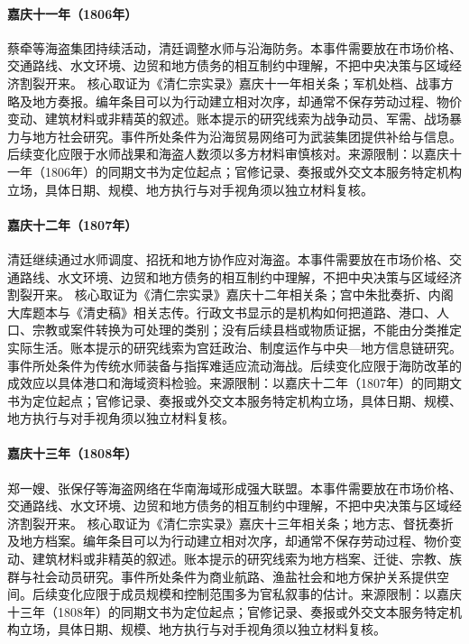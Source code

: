 \hypertarget{civic:EQ-1806-TSAI-QIAN-PIRACY}{}\paragraph{嘉庆十一年（1806年）}蔡牵等海盗集团持续活动，清廷调整水师与沿海防务。本事件需要放在市场价格、交通路线、水文环境、边贸和地方债务的相互制约中理解，不把中央决策与区域经济割裂开来。 核心取证为《清仁宗实录》嘉庆十一年相关条；军机处档、战事方略及地方奏报。编年条目可以为行动建立相对次序，却通常不保存劳动过程、物价变动、建筑材料或非精英的叙述。账本提示的研究线索为战争动员、军需、战场暴力与地方社会研究。事件所处条件为沿海贸易网络可为武装集团提供补给与信息。后续变化应限于水师战果和海盗人数须以多方材料审慎核对。来源限制：以嘉庆十一年（1806年）的同期文书为定位起点；官修记录、奏报或外交文本服务特定机构立场，具体日期、规模、地方执行与对手视角须以独立材料复核。
\hypertarget{civic:EQ-1807-COASTAL-NAVAL-REFORM}{}\paragraph{嘉庆十二年（1807年）}清廷继续通过水师调度、招抚和地方协作应对海盗。本事件需要放在市场价格、交通路线、水文环境、边贸和地方债务的相互制约中理解，不把中央决策与区域经济割裂开来。 核心取证为《清仁宗实录》嘉庆十二年相关条；宫中朱批奏折、内阁大库题本与《清史稿》相关志传。行政文书显示的是机构如何把道路、港口、人口、宗教或案件转换为可处理的类别；没有后续县档或物质证据，不能由分类推定实际生活。账本提示的研究线索为宫廷政治、制度运作与中央—地方信息链研究。事件所处条件为传统水师装备与指挥难适应流动海战。后续变化应限于海防改革的成效应以具体港口和海域资料检验。来源限制：以嘉庆十二年（1807年）的同期文书为定位起点；官修记录、奏报或外交文本服务特定机构立场，具体日期、规模、地方执行与对手视角须以独立材料复核。
\hypertarget{civic:EQ-1808-PIRATE-ALLIANCES}{}\paragraph{嘉庆十三年（1808年）}郑一嫂、张保仔等海盗网络在华南海域形成强大联盟。本事件需要放在市场价格、交通路线、水文环境、边贸和地方债务的相互制约中理解，不把中央决策与区域经济割裂开来。 核心取证为《清仁宗实录》嘉庆十三年相关条；地方志、督抚奏折及地方档案。编年条目可以为行动建立相对次序，却通常不保存劳动过程、物价变动、建筑材料或非精英的叙述。账本提示的研究线索为地方档案、迁徙、宗教、族群与社会动员研究。事件所处条件为商业航路、渔盐社会和地方保护关系提供空间。后续变化应限于成员规模和控制范围多为官私叙事的估计。来源限制：以嘉庆十三年（1808年）的同期文书为定位起点；官修记录、奏报或外交文本服务特定机构立场，具体日期、规模、地方执行与对手视角须以独立材料复核。
